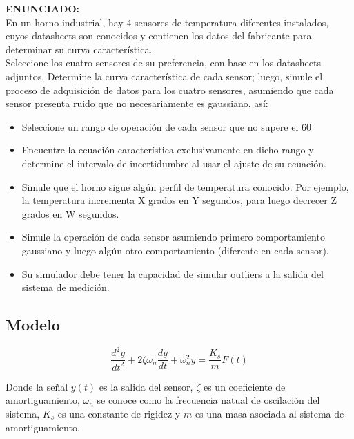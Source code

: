 \documentclass[conference]{IEEEtran}
\begin{document}
\textbf{ENUNCIADO:}\\

En un horno industrial, hay 4 sensores de temperatura diferentes instalados, cuyos datasheets son conocidos y contienen los datos del fabricante para determinar su curva característica. \\

Seleccione los cuatro sensores de su preferencia, con base en los datasheets adjuntos. Determine la curva característica de cada sensor; luego, simule el proceso de adquisición de datos para los cuatro sensores, asumiendo que cada sensor presenta ruido que no necesariamente es gaussiano, así:\\

\begin{itemize}
	\item Seleccione un rango de operación de cada sensor que no supere el 60%
	\item Encuentre la ecuación característica exclusivamente en dicho rango y determine el intervalo de incertidumbre al usar el ajuste de su ecuación.
	\item Simule que el horno sigue algún perfil de temperatura conocido. Por ejemplo, la temperatura incrementa X grados en Y segundos, para luego decrecer Z grados en W segundos. 
	\item Simule la operación de cada sensor asumiendo primero comportamiento gaussiano y luego algún otro comportamiento (diferente en cada sensor).
	\item Su simulador debe tener la capacidad de simular outliers a la salida del sistema de medición. 
\end{itemize}


\subsection{Modelo}

\begin{equation}
	\frac{d^2y}{dt^2} + 2\zeta\omega_n \frac{dy}{dt} + \omega_n^2 y = \frac{K_s}{m} F(t)
\end{equation}


Donde la se\~nal $y(t)$ es la salida del sensor, $\zeta$ es un coeficiente de amortiguamiento, $\omega_n$ se conoce como la frecuencia natual de oscilaci\'on del sistema, ${K_s}$ es una constante de rigidez y $m$ es una masa asociada al sistema de amortiguamiento.
\end{document}

